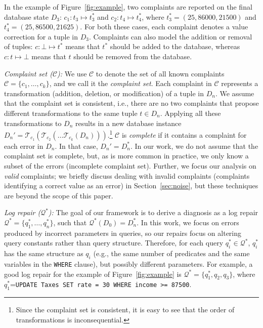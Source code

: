 In the example of Figure~\ref{fig:example}, two complaints are reported on the final database state $D_3$: 
$c_1: t_3\mapsto t_3^*$ and
$c_2: t_4\mapsto t_4^*$, where $t_3^*=(25,86000,21500)$
and $t_4^*=(25,86500,21625)$.  For both these cases, each complaint denotes a value correction for a tuple in $D_3$.  Complaints can also model the addition or removal of tuples: $c: \bot\mapsto t^*$ means that $t^*$ should be added to the database, whereas $c: t\mapsto \bot$
means that $t$ should be removed from the database.


\smallskip
\noindent
\emph{Complaint set ($\mathcal{C}$):}
We use $\mathcal{C}$ to denote the set of all known complaints
$\mathcal{C}=\{c_1,\dots,c_k\}$, and we call it the \emph{complaint set}.
Each complaint in $\mathcal{C}$ represents a transformation (addition,
deletion, or modification) of a tuple in $D_n$. We assume that the
complaint set is consistent, i.e., there are no two complaints that
propose different transformations to the same tuple $t\in D_n$.
Applying all these transformations to $D_n$ results in a new database
instance
$D_n'=\mathcal{T}_{c_1}(\mathcal{T}_{c_2}(\dots\mathcal{T}_{c_k}(D_n)))$.\footnote{Since
the complaint set is consistent, it is easy to see that the order of
transformations is inconsequential.} $\mathcal{C}$ is \emph{complete}
if it contains a complaint for each error in $D_n$. In that case,
$D_n'=D_n^*$. In our work, we do not assume that the complaint set is
complete, but, as is more common in practice, we only know a subset of
the errors (incomplete complaint set). Further, we focus our analysis
on \emph{valid} complaints; we briefly discuss dealing with invalid
complaints (complaints identifying a correct value as an error) in
Section~\ref{sec:noise}, but these techniques are beyond the scope of this paper.

\smallskip
\noindent
\emph{Log repair ($\mathcal{Q}^*$):}
The goal of our framework is to derive a diagnosis as a log repair
$\mathcal{Q}^*=\{q_1^*,\dots, q_n^*\}$, such that
$\mathcal{Q}^*(D_0)=D_n^*$. In this work, we focus on errors produced
by incorrect parameters in queries, so our repairs focus on altering
query constants rather than query structure. Therefore, for each query
$q_i^*\in\mathcal{Q}^*$, $q_i^*$ has the same structure as $q_i$
(e.g., the same number of predicates and the same variables in the \texttt{WHERE} clause), 
but possibly different parameters. For example, a good log repair for the
example of Figure~\ref{fig:example} is
$\mathcal{Q}^*=\{q_1^*,q_2,q_3\}$, where $q_1^*$=\texttt{UPDATE Taxes
SET rate = 30 WHERE income >= 87500}.


